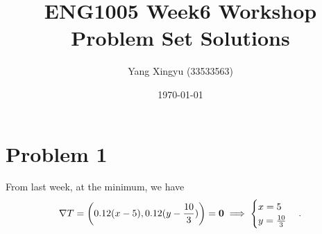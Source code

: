 \documentclass[12pt,a4paper]{article}
\begin{document}
\title{ENG1005 Week6 Workshop Problem Set Solutions}
\author{Yang Xingyu (33533563)}
\date{\today}
\maketitle

\section*{Problem 1}
\begin{solution}
From last week, at the minimum, we have 
$$\nabla T = \left(0.12(x - 5), 0.12(y - \frac{10}{3})\right) = \mathbf{0} \implies 
\begin{cases}
        x = 5\\
        y = \frac{10}{3}
\end{cases}.$$
\end{solution}
\end{document}
